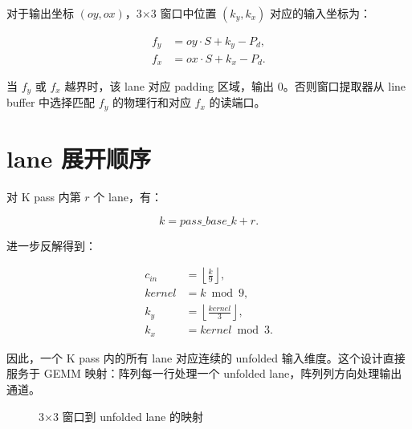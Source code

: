 \documentclass[fontset=fandol,ugly,language=chinese]{pkuthss}
\begin{document}
对于输出坐标 $(oy,ox)$，3$\times$3 窗口中位置 $(k_y,k_x)$ 对应的输入坐标为：

\begin{align}
f_y &= oy \cdot S + k_y - P_d,\\
f_x &= ox \cdot S + k_x - P_d.
\end{align}

当 $f_y$ 或 $f_x$ 越界时，该 lane 对应 padding 区域，输出 0。否则窗口提取器从 line buffer 中选择匹配 $f_y$ 的物理行和对应 $f_x$ 的读端口。

\section{lane 展开顺序}

对 K pass 内第 $r$ 个 lane，有：

\begin{equation}
k = pass\_base\_k + r.
\end{equation}

进一步反解得到：

\begin{align}
c_{in} &= \left\lfloor \frac{k}{9} \right\rfloor,\\
kernel &= k \bmod 9,\\
k_y &= \left\lfloor \frac{kernel}{3} \right\rfloor,\\
k_x &= kernel \bmod 3.
\end{align}

因此，一个 K pass 内的所有 lane 对应连续的 unfolded 输入维度。这个设计直接服务于 GEMM 映射：阵列每一行处理一个 unfolded lane，阵列列方向处理输出通道。

\begin{figure}[htbp]
\centering
{}
\caption{3$\times$3 窗口到 unfolded lane 的映射}
\label{fig:window_lane_report}
\end{figure}
\end{document}
